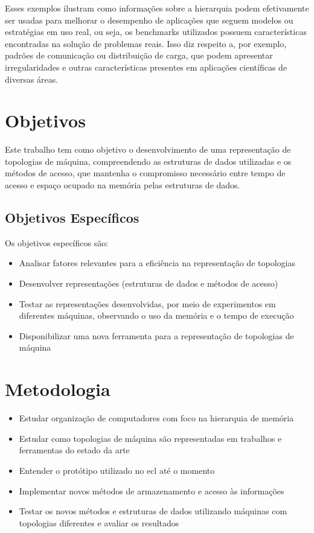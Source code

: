 Esses exemplos ilustram como informações sobre a hierarquia podem efetivamente ser usadas para melhorar o desempenho de aplicações que seguem modelos ou estratégias em uso real, ou seja, os benchmarks utilizados possuem características encontradas na solução de problemas reais.
Isso diz respeito a, por exemplo, padrões de comunicação ou distribuição de carga, que podem apresentar irregularidades e outras características presentes em aplicações científicas de diversas áreas.



\section{Objetivos}
\label{sec:objetivos}

Este trabalho tem como objetivo o desenvolvimento de uma representação de topologias de máquina, compreendendo as estruturas de dados utilizadas e os métodos de acesso, que mantenha o compromisso necessário entre tempo de acesso e espaço ocupado na memória pelas estruturas de dados.

\subsection{Objetivos Específicos}
\label{subsec:objetivos_especificos}

Os objetivos específicos são:
\begin{itemize}
	\item Analisar fatores relevantes para a eficiência na representação de topologias
	\item Desenvolver representações (estruturas de dados e métodos de acesso)
	\item Testar as representações desenvolvidas, por meio de experimentos em diferentes máquinas, observando o uso da memória e o tempo de execução
	\item Disponibilizar uma nova ferramenta para a representação de topologias de máquina
\end{itemize}



\section{Metodologia}
\label{sec:metodologia}

\begin{itemize}
	\item Estudar organização de computadores com foco na hierarquia de memória
	\item Estudar como topologias de máquina são representadas em trabalhos e ferramentas do estado da arte
	\item Entender o protótipo utilizado no \ac{ecl} até o momento
	\item Implementar novos métodos de armazenamento e acesso às informações
	\item Testar os novos métodos e estruturas de dados utilizando máquinas com topologias diferentes e avaliar os resultados
\end{itemize}



